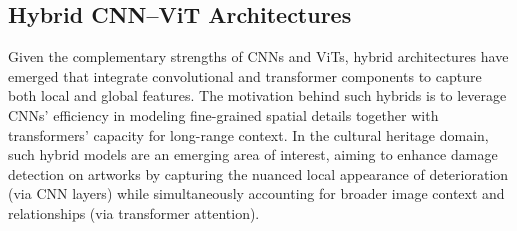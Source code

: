 \documentclass[conference]{IEEEtran}
\begin{document}


\subsection{Hybrid CNN–ViT Architectures}
Given the complementary strengths of CNNs and ViTs, hybrid architectures have emerged that integrate convolutional and transformer components to capture both local and global features. The motivation behind such hybrids is to leverage CNNs’ efficiency in modeling fine-grained spatial details together with transformers’ capacity for long-range context. In the cultural heritage domain, such hybrid models are an emerging area of interest, aiming to enhance damage detection on artworks by capturing the nuanced local appearance of deterioration (via CNN layers) while simultaneously accounting for broader image context and relationships (via transformer attention).~\cite{wang_fusion_2025}
\end{document}
